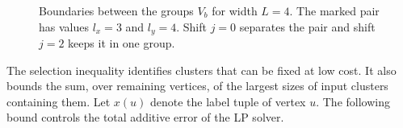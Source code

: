 \documentclass[11pt]{article}
\begin{document}
\begin{figure}[htbp]
\centering
{}
\caption{Boundaries between the groups $V_b$ for width $L=4$. The marked pair has values $l_x=3$ and $l_y=4$. Shift $j=0$ separates the pair and shift $j=2$ keeps
it in one group.}
\label{fig:bands}
\end{figure}

The selection inequality identifies clusters that can be fixed at low cost.
It also bounds the sum, over remaining vertices, of the largest sizes
of input clusters containing them. Let $x(u)$ denote the label tuple of vertex $u$.
The following bound controls the total additive error of the LP solver.
\end{document}
